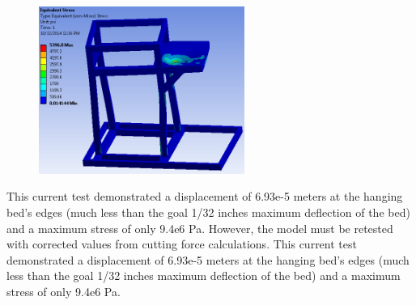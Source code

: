 \begin{figure}[H]
    \centering
    \includegraphics[width=0.6\textwidth]{./images/Chapter3-Calculations/mp2}
    \label{fig:MM2}
\end{figure}

This current test demonstrated a displacement of 6.93e-5 meters at the hanging bed’s edges (much less than the goal 1/32 inches maximum deflection of the bed) and a maximum stress of only 9.4e6 Pa. However, the model must be retested with corrected values from cutting force calculations. This current test demonstrated a displacement of 6.93e-5 meters at the hanging bed’s edges (much less than the goal 1/32 inches maximum deflection of the bed) and a maximum stress of only 9.4e6 Pa.


